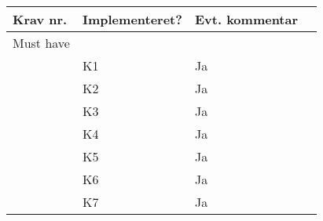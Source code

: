 \documentclass[class=article, crop=false]{standalone}
\begin{document}
    \begin{table}[]
        \begin{tabular}{|l|l|l|l|}
            \hline
            Krav nr.        & Implementeret? & Evt. kommentar     &                                                                                                                                                                                                    \\ \hline
            Must have       &                &                    &                                                                                                                                                                                                    \\ \hline
            & K1             & Ja                 &                                                                                                                                                                                                    \\ \hline
            & K2             & Ja                 &                                                                                                                                                                                                    \\ \hline
            & K3             & Ja                 &                                                                                                                                                                                                    \\ \hline
            & K4             & Ja                 &                                                                                                                                                                                                    \\ \hline
            & K5             & Ja                 &                                                                                                                                                                                                    \\ \hline
            & K6             & Ja                 &                                                                                                                                                                                                    \\ \hline
            & K7             & Ja                 &                                                                                                                                                                                                    \\ \hline

\end{tabular}
\end{table}
\end{document}
